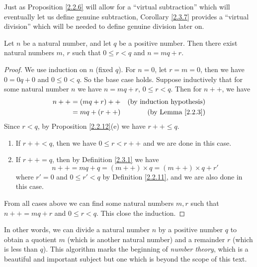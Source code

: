 \begin{remark}\label{2.3.8}
    Just as Proposition \ref{2.2.6} will allow for a ``virtual subtraction'' which will eventually let us define genuine subtraction, Corollary \ref{2.3.7} provides a ``virtual division'' which will be needed to define genuine division later on.
\end{remark}

\begin{proposition}\label{2.3.9}
    Let \(n\) be a natural number, and let \(q\) be a positive number.
    Then there exist natural numbers \(m\), \(r\) such that \(0 \leq r<q\) and \(n = mq + r\).
\end{proposition}

\begin{proof}
    We use induction on \(n\) (fixed \(q\)).
    For \(n = 0\), let \(r = m = 0\), then we have \(0 = 0q + 0\) and \(0 \leq 0 < q\).
    So the base case holds.
    Suppose inductively that for some natural number \(n\) we have \(n = mq + r\), \(0 \leq r < q\).
    Then for \(n++\), we have
    \begin{align*}
        n++ & = (mq + r)++ & \text{(by induction hypothesis)} \\
            & = mq + (r++) & \text{(by Lemma \ref{2.2.3})}    \\
    \end{align*}
    Since \(r < q\), by Proposition \ref{2.2.12}(e) we have \(r++ \leq q\).
    \begin{enumerate}
        \item If \(r++ < q\), then we have \(0 \leq r < r++\) and we are done in this case.
        \item If \(r++ = q\), then by Definition \ref{2.3.1} we have
              \[
                  n++ = mq + q = (m++) \times q = (m++) \times q + r'
              \]
              where \(r' = 0\) and \(0 \leq r' < q\) by Definition \ref{2.2.11}, and we are also done in this case.
    \end{enumerate}
    From all cases above we can find some natural numbers \(m, r\) such that \(n++ = mq + r\) and \(0 \leq r < q\).
    This close the induction.
\end{proof}

\begin{remark}\label{2.3.10}
    In other words, we can divide a natural number \(n\) by a positive number \(q\) to obtain a quotient \(m\) (which is another natural number) and a remainder \(r\) (which is less than \(q\)).
    This algorithm marks the beginning of \emph{number theory}, which is a beautiful and important subject but one which is beyond the scope of this text.
\end{remark}

